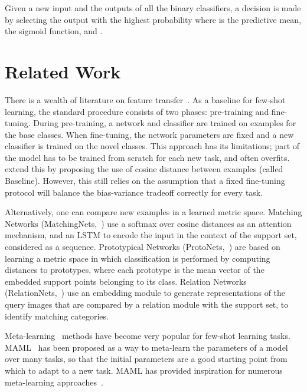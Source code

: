 \documentclass{article}
\begin{document}
Given a new input  and the  outputs of all the binary classifiers, a decision is made by selecting the output with the highest probability  where  is the predictive mean,  the sigmoid function, and .

\section{Related Work}\label{sec_related_work}
There is a wealth of literature on feature transfer~\citep{pan2009survey}. As a baseline for few-shot learning, the standard procedure consists of two phases: pre-training and fine-tuning. During pre-training, a network and classifier are trained on examples for the base classes. When fine-tuning, the network parameters are fixed and a new classifier is trained on the novel classes. This approach has its limitations; part of the model has to be trained from scratch for each new task, and often overfits.~\citet{chen2019closerfewshot} extend this by proposing the use of cosine distance between examples (called Baseline). However, this still relies on the assumption that a fixed fine-tuning protocol will balance the bias-variance tradeoff correctly for every task. 

Alternatively, one can compare new examples in a learned metric space. Matching Networks (MatchingNets,~\citealp{vinyals2016matching}) use a softmax over cosine distances as an attention mechanism, and an LSTM to encode the input in the context of the support set, considered as a sequence. Prototypical Networks (ProtoNets,~\citealp{snell2017prototypical}) are based on learning a metric space in which classification is performed by computing distances to prototypes, where each prototype is the mean vector of the embedded support points belonging to its class.
Relation Networks (RelationNets,~\citealp{sung2018learning}) use an embedding module to generate representations of the query images that are compared by a relation module with the support set, to identify matching categories.

Meta-learning~\citep{bengio1992optimization, schmidhuber1992learning, hospedales2020meta} methods have become very popular for few-shot learning tasks. MAML~\citep{finn2017model} has been proposed as a way to meta-learn the parameters of a model over many tasks, so that the initial parameters are a good starting point from which to adapt to a new task. MAML has provided inspiration for numerous meta-learning approaches~\citep{antoniou2019train, rajeswaran2019meta}.
\end{document}
